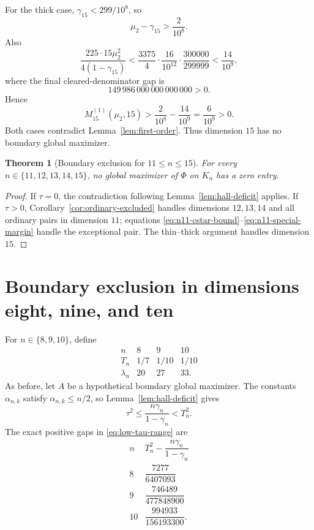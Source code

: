 \documentclass[11pt,a4paper]{article}
\numberwithin{equation}{section}
\newtheorem{theorem}{Theorem}[section]
\theoremstyle{definition}
\newcommand{\1}{\mathbf{1}}
\begin{document}
For the thick case, $\gamma_{15}<299/10^8$, so
\[
 \mu_2-\gamma_{15}>\frac2{10^8}.
\]
Also
\[
 \frac{225\cdot15\mu_2^2}{4(1-\gamma_{15})}
 <\frac{3375}{4}\cdot\frac{16}{10^{12}}
 \cdot\frac{300000}{299999}
 <\frac{14}{10^9},
\]
where the final cleared-denominator gap is
\[
 149\,986\,000\,000\,000\,000>0.
\]
Hence
\begin{equation}\label{eq:n15-thick-margin}
 M_{15}^{(1)}(\mu_2,15)
 >\frac2{10^8}-\frac{14}{10^9}
 =\frac6{10^9}>0.
\end{equation}
Both cases contradict Lemma~\ref{lem:first-order}.  Thus dimension $15$ has no boundary global maximizer.

\begin{theorem}[Boundary exclusion for $11\le n\le15$]\label{thm:boundary-mid-high}
For every $n\in\{11,12,13,14,15\}$, no global maximizer of $\Phi$ on $K_n$ has a zero entry.
\end{theorem}

\begin{proof}
If $\tau=0$, the contradiction following Lemma~\ref{lem:hall-deficit} applies.  If $\tau>0$, Corollary~\ref{cor:ordinary-excluded} handles dimensions $12,13,14$ and all ordinary pairs in dimension $11$; equations \eqref{eq:n11-cstar-bound}--\eqref{eq:n11-special-margin} handle the exceptional pair.  The thin--thick argument handles dimension $15$.
\end{proof}

\section{Boundary exclusion in dimensions eight, nine, and ten}\label{sec:low}

For $n\in\{8,9,10\}$, define
\begin{equation}\label{eq:low-parameters}
\begin{array}{c|ccc}
 n&8&9&10\\ \hline
 T_n&1/7&1/10&1/10\\
 \lambda_n&20&27&33.
\end{array}
\end{equation}
As before, let $A$ be a hypothetical boundary global maximizer.  The constants $\alpha_{n,k}$ satisfy $\alpha_{n,k}\le n/2$, so Lemma~\ref{lem:hall-deficit} gives
\begin{equation}\label{eq:low-tau-range}
 \tau^2\le\frac{n\gamma_n}{1-\gamma_n}<T_n^2.
\end{equation}
The exact positive gaps in \eqref{eq:low-tau-range} are
\begin{equation}\label{eq:tau-range-gaps}
\begin{array}{c|c}
 n&T_n^2-\dfrac{n\gamma_n}{1-\gamma_n}\\ \hline
 8&\dfrac{7277}{6407093}\\[2mm]
 9&\dfrac{746489}{477848900}\\[2mm]
 10&\dfrac{994933}{156193300}.
\end{array}
\end{equation}
\end{document}
